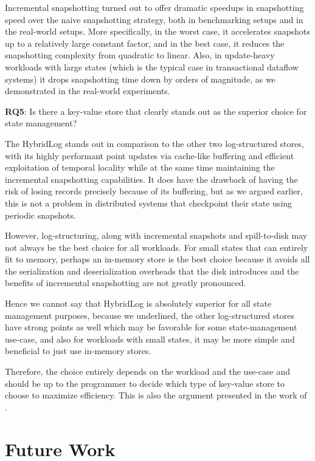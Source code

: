 Incremental snapshotting turned out to offer dramatic speedups in snapshotting speed over the naive snapshotting strategy, both in benchmarking setups and in the real-world setups.
More specifically, in the worst case, it accelerates snapshots up to a relatively large constant factor, and in the best case, it reduces the snapshotting complexity from quadratic to linear.
Also, in update-heavy workloads with large states (which is the typical case in transactional dataflow systems) it drops snapshotting time down by orders of magnitude, as we demonstrated in the real-world experiments.

\begin{tcolorbox}
    \textbf{RQ5}: Is there a key-value store that clearly stands out as the superior choice for state management?
\end{tcolorbox}

The HybridLog stands out in comparison to the other two log-structured stores, with its highly performant point updates via cache-like buffering and efficient exploitation of temporal locality while at the same time maintaining the incremental snapshotting capabilities. It does have the drawback of having the risk of losing records precisely because of its buffering, but as we argued earlier, this is not a problem in distributed systems that checkpoint their state using periodic snapshots.

However, log-structuring, along with incremental snapshots and spill-to-disk may not always be the best choice for all workloads. For small states that can entirely fit to memory, perhaps an in-memory store is the best choice because it avoids all the serialization and deserialization overheads that the disk introduces and the benefits of incremental snapshotting are not greatly pronounced.

Hence we cannot say that HybridLog is absolutely superior for all state management purposes, because we underlined, the other log-structured stores have strong points as well which may be favorable for some state-management use-case, and also for workloads with small states, it may be more simple and beneficial to just use in-memory stores.

Therefore, the choice entirely depends on the workload and the use-case and should be up to the programmer to decide which type of key-value store to choose to maximize efficiency. This is also the argument presented in the work of \cite{workload-aware-streaming-state-management}.

\section{Future Work}

